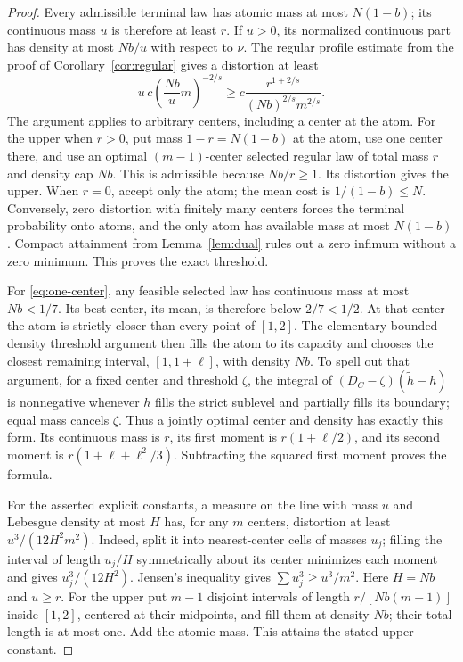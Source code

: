 \begin{proof}
Every admissible terminal law has atomic mass at most $N(1-b)$; its continuous mass $u$ is therefore at least $r$. If $u>0$, its normalized continuous part has density at most $Nb/u$ with respect to $\nu$. The regular profile estimate from the proof of Corollary~\ref{cor:regular} gives a distortion at least
\[
 u\,c\left(\frac{Nb}{u}m\right)^{-2/s}
 \ge c\frac{r^{1+2/s}}{(Nb)^{2/s}m^{2/s}}.
\]
The argument applies to arbitrary centers, including a center at the atom. For the upper when $r>0$, put mass $1-r=N(1-b)$ at the atom, use one center there, and use an optimal $(m-1)$-center selected regular law of total mass $r$ and density cap $Nb$. This is admissible because $Nb/r\ge1$. Its distortion gives the upper. When $r=0$, accept only the atom; the mean cost is $1/(1-b)\le N$. Conversely, zero distortion with finitely many centers forces the terminal probability onto atoms, and the only atom has available mass at most $N(1-b)$. Compact attainment from Lemma~\ref{lem:dual} rules out a zero infimum without a zero minimum. This proves the exact threshold.

For \eqref{eq:one-center}, any feasible selected law has continuous mass at most $Nb<1/7$. Its best center, its mean, is therefore below $2/7<1/2$. At that center the atom is strictly closer than every point of $[1,2]$. The elementary bounded-density threshold argument then fills the atom to its capacity and chooses the closest remaining interval, $[1,1+\ell]$, with density $Nb$. To spell out that argument, for a fixed center and threshold $\zeta$, the integral of $(D_C-\zeta)(\widetilde h-h)$ is nonnegative whenever $h$ fills the strict sublevel and partially fills its boundary; equal mass cancels $\zeta$. Thus a jointly optimal center and density has exactly this form. Its continuous mass is $r$, its first moment is $r(1+\ell/2)$, and its second moment is $r(1+\ell+\ell^2/3)$. Subtracting the squared first moment proves the formula.

For the asserted explicit constants, a measure on the line with mass $u$ and Lebesgue density at most $H$ has, for any $m$ centers, distortion at least $u^3/(12H^2m^2)$. Indeed, split it into nearest-center cells of masses $u_j$; filling the interval of length $u_j/H$ symmetrically about its center minimizes each moment and gives $u_j^3/(12H^2)$. Jensen's inequality gives $\sum u_j^3\ge u^3/m^2$. Here $H=Nb$ and $u\ge r$. For the upper put $m-1$ disjoint intervals of length $r/[Nb(m-1)]$ inside $[1,2]$, centered at their midpoints, and fill them at density $Nb$; their total length is at most one. Add the atomic mass. This attains the stated upper constant.
\end{proof}

